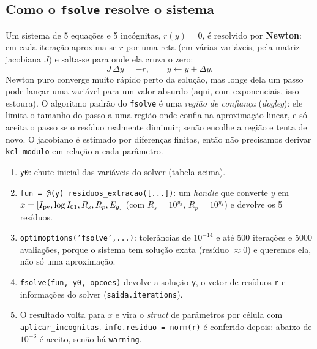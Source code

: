 \subsection{Como o \texttt{fsolve} resolve o sistema}

Um sistema de 5 equa\c{c}\~oes e 5 inc\'ognitas, $r(y)=0$, \'e resolvido por \textbf{Newton}: em cada itera\c{c}\~ao aproxima-se $r$ por uma reta (em v\'arias vari\'aveis, pela
matriz jacobiana $J$) e salta-se para onde ela cruza o zero:
\begin{equation}\label{eq:newton}
J\,\Delta y=-r,\qquad y\leftarrow y+\Delta y .
\end{equation}
Newton puro converge muito r\'apido perto da solu\c{c}\~ao, mas longe dela um passo pode lan\c{c}ar uma vari\'avel para um valor absurdo (aqui, com exponenciais, isso estoura).
O algoritmo padr\~ao do \texttt{fsolve} \'e uma \emph{regi\~ao de confian\c{c}a} (\emph{dogleg}): ele limita o tamanho do passo a uma regi\~ao onde confia na aproxima\c{c}\~ao linear, e s\'o
aceita o passo se o res\'iduo realmente diminuir; sen\~ao encolhe a regi\~ao e tenta de novo. O jacobiano \'e estimado por diferen\c{c}as finitas, ent\~ao n\~ao precisamos
derivar \texttt{kcl\_modulo} em rela\c{c}\~ao a cada par\^ametro.


\begin{logica}
\begin{enumerate}
\item \texttt{y0}: chute inicial das vari\'aveis do solver (tabela acima).
\item \texttt{fun = @(y) residuos\_extracao([...])}: um \emph{handle} que converte $y$ em $x=[I_{\mathrm{pv}},\log I_{01},R_s,R_p,E_g]$ (com $R_s=10^{y_3}$, $R_p=10^{y_4}$) e devolve os 5 res\'iduos.
\item \texttt{optimoptions('fsolve',...)}: toler\^ancias de $10^{-14}$ e at\'e 500 itera\c{c}\~oes e 5000 avalia\c{c}\~oes, porque o sistema tem solu\c{c}\~ao exata (res\'iduo $\approx0$) e queremos
 ela, n\~ao s\'o uma aproxima\c{c}\~ao.
\item \texttt{fsolve(fun, y0, opcoes)} devolve a solu\c{c}\~ao \texttt{y}, o vetor de res\'iduos \texttt{r} e informa\c{c}\~oes do solver (\texttt{saida.iterations}).
\item O resultado volta para $x$ e vira o \emph{struct} de par\^ametros por c\'elula com \texttt{aplicar\_incognitas}. \texttt{info.residuo = norm(r)} \'e conferido depois: abaixo de $10^{-6}$ \'e
 aceito, sen\~ao h\'a \texttt{warning}.
\end{enumerate}
\end{logica}

